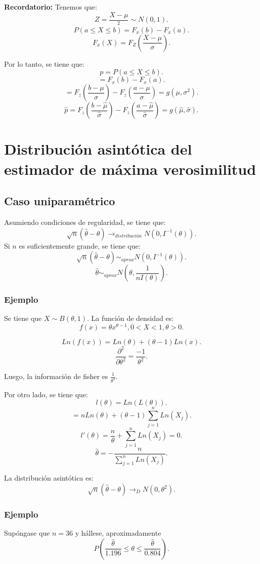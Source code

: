 \documentclass{article}
\begin{document}
\textbf{Recordatorio:} Tenemos que:
\[ Z = \frac{X-\mu}{^{2}}\sim N{(0,1)}.\]
\[ P{(a \leq X \leq b)}=F_{x}{(b)}-F_{x}{(a)}.\]
\[ F_{x}{(X)}=F_{Z}{(\frac{X-\mu}{\sigma})}.\]

Por lo tanto, se tiene que:
\[ p = P{(a \leq X \leq b)}.\]
\[ = F_{x}{(b)}-F_{x}{(a)}.\]
\[ = F_{z}{(\frac{b-\mu}{\sigma})}-F_{z}{(\frac{a-\mu}{\sigma})}=g{(\mu,\sigma^{2})}.\]
\[ \hat{p}= F_{z}{(\frac{b-\hat{\mu}}{\hat{\sigma}})}-F_{z}{(\frac{a-\hat{\mu}}{\hat{\sigma}})}=g{(\hat{\mu},\hat{\sigma})}.\]

\section{Distribución asintótica del estimador de máxima verosimilitud}
\subsection{Caso uniparamétrico}
Asumiendo condiciones de regularidad, se tiene que:
\[ \sqrt{n}{(\hat{\theta}-\theta)} \rightarrow_{distribución} N{(0,I^{-1}{(\theta)})}.\]
Si $n$ es suficientemente grande, se tiene que:
\[ \sqrt{n}{(\hat{\theta}-\theta)} \sim_{aprox} N{(0,I^{-1}{(\theta)})}.\]
\[ \hat{\theta} \sim_{aprox} N{(\theta,\frac{1}{n I{(\theta)}})}.\]

\subsubsection{Ejemplo}
Se tiene que $X\sim B{(\theta,1)}$. La función de densidad es:
\[ f{(x)}=\theta x^{\theta-1}, 0 < X < 1, \theta > 0.\]

\[ Ln{(f{(x)})}=Ln{(\theta)}+{(\theta-1)}Ln{(x)}.\]
\[ \frac{\partial^{2}}{\partial \theta^{2}}=\frac{-1}{\theta^{2}}.\]

Luego, la información de fisher es $\frac{1}{\theta^{2}}$.

Por otro lado, se tiene que:
\[ l{(\theta)}=Ln{(L{(\theta)})}.\]
\[ =n Ln{(\theta)}+{(\theta-1)}\sum_{j=1}^{n}Ln{(X_{j})}.\]
\[ l'{(\theta)}=\frac{n}{\theta}+\sum_{j=1}^{n}Ln{(X_{j})}=0.\]
\[ \hat{\theta}=-\frac{n}{\sum_{j=1}^{n}Ln{(X_{j})}}.\]

La distribución asintótica es:
\[ \sqrt{n}{(\hat{\theta}-\theta)} \rightarrow_{D} N{(0,\theta^{2})}.\]
\subsubsection{Ejemplo}
Supóngase que $n=36$ y hállese, aproximadamente
\[ P{(\frac{\hat{\theta}}{1.196}\leq \theta \leq \frac{\hat{\theta}}{0.804})}.\]
\end{document}
